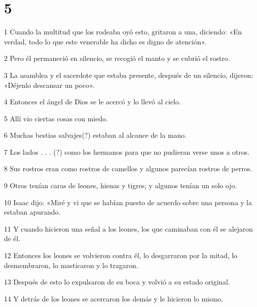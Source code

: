 \chapter{5}

\par 1 Cuando la multitud que los rodeaba oyó esto, gritaron a una, diciendo: «En verdad, todo lo que este venerable ha dicho es digno de atención».

\par 2 Pero él permaneció en silencio, se recogió el manto y se cubrió el rostro.

\par 3 La asamblea y el sacerdote que estaba presente, después de un silencio, dijeron: «Déjenlo descansar un poco».

\par 4 Entonces el ángel de Dios se le acercó y lo llevó al cielo.

\par 5 Allí vio ciertas cosas con miedo.

\par 6 Muchas bestias salvajes(?) estaban al alcance de la mano.

\par 7 Los lados . . . (?) como los hermanos para que no pudieran verse unos a otros.

\par 8 Sus rostros eran como rostros de camellos y algunos parecían rostros de perros.

\par 9 Otros tenían caras de leones, hienas y tigres; y algunos tenían un solo ojo.

\par 10 Isaac dijo: «Miré y vi que se habían puesto de acuerdo sobre una persona y la estaban apurando.

\par 11 Y cuando hicieron una señal a los leones, los que caminaban con él se alejaron de él.

\par 12 Entonces los leones se volvieron contra él, lo desgarraron por la mitad, lo desmembraron, lo masticaron y lo tragaron.

\par 13 Después de esto lo expulsaron de su boca y volvió a su estado original.

\par 14 Y detrás de los leones se acercaron los demás y le hicieron lo mismo.

